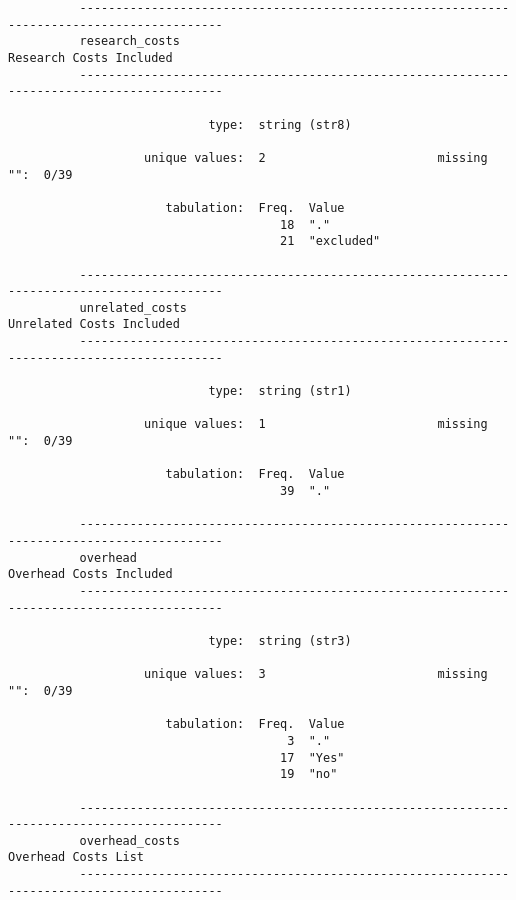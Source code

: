 \documentclass{article}
\begin{document}
\begin{verbatim}
          ------------------------------------------------------------------------------------------
          research_costs                                                     Research Costs Included
          ------------------------------------------------------------------------------------------
          
                            type:  string (str8)
          
                   unique values:  2                        missing "":  0/39
          
                      tabulation:  Freq.  Value
                                      18  "."
                                      21  "excluded"
          
          ------------------------------------------------------------------------------------------
          unrelated_costs                                                   Unrelated Costs Included
          ------------------------------------------------------------------------------------------
          
                            type:  string (str1)
          
                   unique values:  1                        missing "":  0/39
          
                      tabulation:  Freq.  Value
                                      39  "."
          
          ------------------------------------------------------------------------------------------
          overhead                                                           Overhead Costs Included
          ------------------------------------------------------------------------------------------
          
                            type:  string (str3)
          
                   unique values:  3                        missing "":  0/39
          
                      tabulation:  Freq.  Value
                                       3  "."
                                      17  "Yes"
                                      19  "no"
          
          ------------------------------------------------------------------------------------------
          overhead_costs                                                         Overhead Costs List
          ------------------------------------------------------------------------------------------
          

\end{verbatim}
\end{document}
